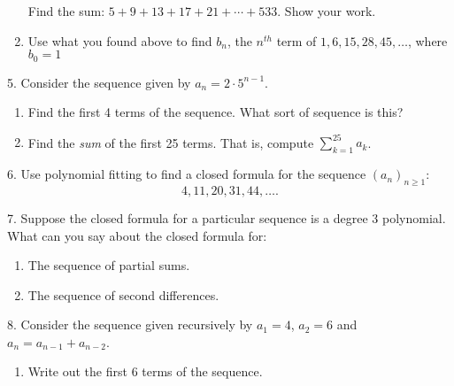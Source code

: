 \documentclass[10pt,]{book}
\theoremstyle{plain}
\theoremstyle{definition}
\theoremstyle{definition}
\theoremstyle{definition}
\numberwithin{equation}{chapter}
\def\d{\displaystyle}
\begin{document}
\begin{exerciselist}
\begin{enumerate}[label=(\alph*)]
                Find the sum: \(5 + 9 + 13 + 17 + 21 + \cdots + 533\). Show your work.
\item\hypertarget{li-970}{}
                Use what you found above to find \(b_n\), the \(n^{th}\) term of \(1, 6, 15, 28, 45, \ldots\), where \(b_0 = 1\)
\end{enumerate}
\par\smallskip
\item[5.]\hypertarget{exercise-192}{}
            Consider the sequence given by \(a_n = 2\cdot 5^{n-1}\).
\leavevmode%
\begin{enumerate}[label=(\alph*)]
\item\hypertarget{li-977}{}
                Find the first 4 terms of the sequence. What sort of sequence is this?
\item\hypertarget{li-978}{}
                Find the \emph{sum} of the first 25 terms. That is, compute \(\d\sum_{k=1}^{25}a_k\).
\end{enumerate}
\par\smallskip
\item[6.]\hypertarget{exercise-193}{}
            Use polynomial fitting to find a closed formula for the sequence \((a_n)_{n\ge 1}\):
            \begin{equation*}4, 11, 20, 31, 44, \ldots.\end{equation*}
\par\smallskip
\item[7.]\hypertarget{exercise-194}{}
            Suppose the closed formula for a particular sequence is a degree 3 polynomial. What can you say about the closed formula for:
\leavevmode%
\begin{enumerate}[label=(\alph*)]
\item\hypertarget{li-981}{}
                The sequence of partial sums.
\item\hypertarget{li-982}{}
                The sequence of second differences.
\end{enumerate}
\par\smallskip
\item[8.]\hypertarget{exercise-195}{}
            Consider the sequence given recursively by \(a_1 = 4\), \(a_2 = 6\) and \(a_n = a_{n-1} + a_{n-2}\).
\leavevmode%
\begin{enumerate}[label=(\alph*)]
\item\hypertarget{li-985}{}
                Write out the first 6 terms of the sequence.

\end{enumerate}
\end{exerciselist}
\end{document}

